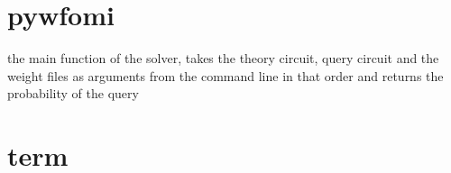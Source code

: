 \documentclass[letterpaper,10pt,english,openany,oneside]{sphinxmanual}
\begin{document}
\section{pywfomi}
\label{\detokenize{index:module-pywfomi}}\label{\detokenize{index:pywfomi}}\label{\detokenize{index:module-wfomi}}

\begin{fulllineitems}
\label{\detokenize{index:pywfomi.pywfomi}}
the main function of the solver, takes the theory circuit, query circuit and the weight files 
as arguments from the command line in that order and returns the probability of the query

\end{fulllineitems}



\section{term}
\label{\detokenize{index:module-term}}\label{\detokenize{index:term}}\label{\detokenize{index:module-0}}
\end{document}
